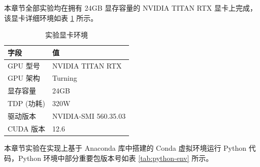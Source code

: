 本章节全部实验均在拥有 24GB 显存容量的 NVIDIA TITAN RTX 显卡上完成，该显卡详细环境如表 \ref{tab:gpu-env} 所示。

\begin{table}[h]
\centering
\caption{实验显卡环境} \label{tab:gpu-env}
\begin{tabular}{ll}
\toprule
\textbf{字段} & \textbf{值}           \\ \midrule
GPU   型号    & NVIDIA TITAN RTX     \\
GPU   架构    & Turning              \\
显存容量        & 24GB                 \\
TDP   (功耗)  & 320W                 \\
驱动版本        & NVIDIA-SMI 560.35.03 \\
CUDA   版本   & 12.6                 \\ \bottomrule
\end{tabular}
\end{table}

本章节实验在实现上基于 Anaconda 库中搭建的 Conda 虚拟环境运行 Python 代码，Python 环境中部分重要包版本号如表 \ref{tab:python-env} 所示。

